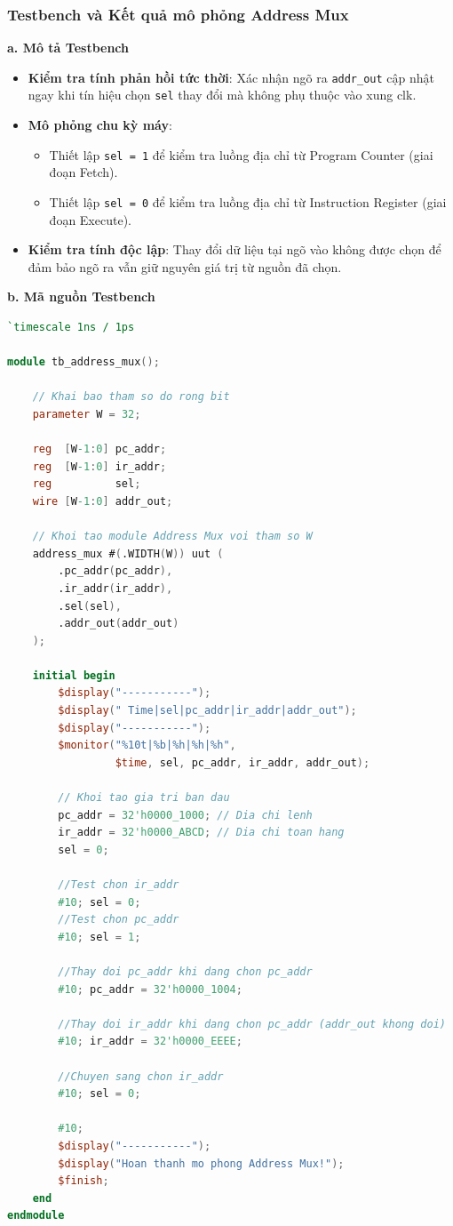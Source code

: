 \subsubsection{Testbench và Kết quả mô phỏng Address Mux}

\textbf{a. Mô tả Testbench} \\
\begin{itemize}
    \item \textbf{Kiểm tra tính phản hồi tức thời}: Xác nhận ngõ ra \texttt{addr\_out} cập nhật ngay khi tín hiệu chọn \texttt{sel} 
    thay đổi mà không phụ thuộc vào xung clk.
    \item \textbf{Mô phỏng chu kỳ máy}: 
        \begin{itemize}
            \item Thiết lập \texttt{sel = 1} để kiểm tra luồng địa chỉ từ Program Counter (giai đoạn Fetch).
            \item Thiết lập \texttt{sel = 0} để kiểm tra luồng địa chỉ từ Instruction Register (giai đoạn Execute).
        \end{itemize}
    \item \textbf{Kiểm tra tính độc lập}: Thay đổi dữ liệu tại ngõ vào không được chọn 
    để đảm bảo ngõ ra vẫn giữ nguyên giá trị từ nguồn đã chọn.
\end{itemize}

\textbf{b. Mã nguồn Testbench}
\begin{lstlisting}[language=Verilog, caption={Ma nguon Testbench kiem tra Address Mux}]
`timescale 1ns / 1ps

module tb_address_mux();

    // Khai bao tham so do rong bit
    parameter W = 32;

    reg  [W-1:0] pc_addr;
    reg  [W-1:0] ir_addr;
    reg          sel;
    wire [W-1:0] addr_out;

    // Khoi tao module Address Mux voi tham so W 
    address_mux #(.WIDTH(W)) uut (
        .pc_addr(pc_addr),
        .ir_addr(ir_addr),
        .sel(sel),
        .addr_out(addr_out)
    );

    initial begin
        $display("-----------");
        $display(" Time|sel|pc_addr|ir_addr|addr_out");
        $display("-----------");
        $monitor("%10t|%b|%h|%h|%h", 
                 $time, sel, pc_addr, ir_addr, addr_out);

        // Khoi tao gia tri ban dau
        pc_addr = 32'h0000_1000; // Dia chi lenh 
        ir_addr = 32'h0000_ABCD; // Dia chi toan hang 
        sel = 0;

        //Test chon ir_addr 
        #10; sel = 0; 
        //Test chon pc_addr 
        #10; sel = 1;

        //Thay doi pc_addr khi dang chon pc_addr
        #10; pc_addr = 32'h0000_1004;

        //Thay doi ir_addr khi dang chon pc_addr (addr_out khong doi)
        #10; ir_addr = 32'h0000_EEEE;

        //Chuyen sang chon ir_addr
        #10; sel = 0;

        #10;
        $display("-----------");
        $display("Hoan thanh mo phong Address Mux!");
        $finish;
    end
endmodule
\end{lstlisting}

